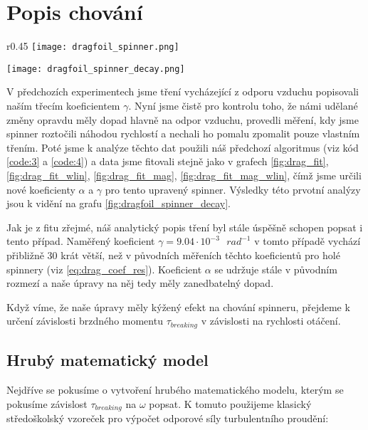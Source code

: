 \clearpage

\section{Popis chování}

\begin{wrapfigure}{r}{0.45\textwidth}
    \vspace{-1cm}
    \texttt{[image: dragfoil\_spinner.png]}
    \centering
    \caption{Spinner upravený k měření přenášeného momentu síly.}
    \label{fig:dragfoil_spinner}

    \vspace{1cm}
    \texttt{[image: dragfoil\_spinner\_decay.png]}
    \centering
    \caption{Výsledky měření k určení třecích koeficientů spinneru.}
    \label{fig:dragfoil_spinner_decay}
\end{wrapfigure}

V předchozích experimentech jsme tření vycházející z odporu vzduchu popisovali naším třecím koeficientem $\gamma$. Nyní jsme čistě pro kontrolu toho, že námi udělané změny opravdu měly dopad hlavně na odpor vzduchu, provedli měření, kdy jsme spinner roztočili  náhodou rychlostí a nechali ho pomalu zpomalit pouze vlastním třením. Poté jsme k analýze těchto dat použili náš předchozí algoritmus (viz kód \ref{code:3} a \ref{code:4}) a data jsme fitovali stejně jako v grafech \ref{fig:drag_fit}, \ref{fig:drag_fit_wlin}, \ref{fig:drag_fit_mag}, \ref{fig:drag_fit_mag_wlin}, čímž jsme určili nové koeficienty $\alpha$ a $\gamma$ pro tento upravený spinner. Výsledky této prvotní analýzy jsou k vidění na grafu \ref{fig:dragfoil_spinner_decay}.

Jak je z fitu zřejmé, náš analytický popis tření byl stále úspěšně schopen popsat i tento případ. Naměřený koeficient $\gamma = 9.04\cdot10^{-3} \text{ } rad^{-1}$ v tomto případě vychází přibližně 30 krát větší, než v původních měřeních těchto koeficientů pro holé spinnery (viz \autoref{eq:drag_coef_res}). Koeficient $\alpha$ se udržuje stále v původním rozmezí a naše úpravy na něj tedy měly zanedbatelný dopad.

Když víme, že naše úpravy měly kýžený efekt na chování spinneru, přejdeme k určení závislosti brzdného momentu $\tau_{breaking}$ v závislosti na rychlosti otáčení.

{
    \raggedright
    \subsection{Hrubý matematický model}
    Nejdříve se pokusíme o vytvoření hrubého matematického modelu, kterým se pokusíme závislost $\tau_{breaking}$ na $\omega$ popsat. K tomuto použijeme klasický středoškolský vzoreček pro výpočet odporové síly turbulentního proudění:
}

